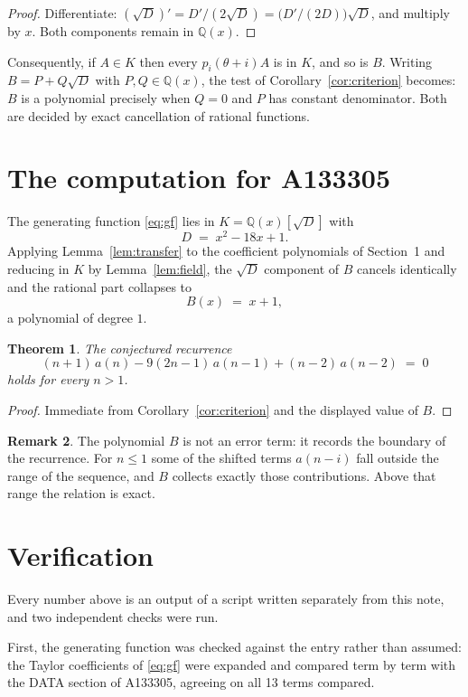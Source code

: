 \documentclass[11pt,a4paper]{article}
\theoremstyle{plain}
\newtheorem{theorem}{Theorem}
\theoremstyle{definition}
\newtheorem{remark}[theorem]{Remark}
\begin{document}
\begin{proof}
Differentiate: $(\sqrt{D})'=D'/(2\sqrt{D})=\bigl(D'/(2D)\bigr)\sqrt{D}$, and multiply by
$x$. Both components remain in $\mathbb{Q}(x)$.
\end{proof}

Consequently, if $A\in K$ then every $p_{i}(\theta+i)A$ is in $K$, and so is $B$. Writing
$B=P+Q\sqrt{D}$ with $P,Q\in\mathbb{Q}(x)$, the test of Corollary~\ref{cor:criterion}
becomes: $B$ is a polynomial precisely when $Q=0$ and $P$ has constant denominator. Both
are decided by exact cancellation of rational functions.

\section{The computation for A133305}

The generating function \eqref{eq:gf} lies in $K=\mathbb{Q}(x)[\sqrt{D}]$ with
\[
D \;=\; x^{2} - 18 x + 1 .
\]
Applying Lemma~\ref{lem:transfer} to the coefficient polynomials of Section~1 and reducing
in $K$ by Lemma~\ref{lem:field}, the $\sqrt{D}$ component of $B$ cancels identically and
the rational part collapses to
\[
B(x)\;=\;x + 1 ,
\]
a polynomial of degree $1$.

\begin{theorem}
The conjectured recurrence
\[
(n + 1)\,a(n) -  9 \left(2 n - 1\right)\,a(n-1) + (n - 2)\,a(n-2) \;=\;0
\]
holds for every $n>1$.
\end{theorem}

\begin{proof}
Immediate from Corollary~\ref{cor:criterion} and the displayed value of $B$.
\end{proof}

\begin{remark}
The polynomial $B$ is not an error term: it records the boundary of the recurrence. For
$n\le1$ some of the shifted terms $a(n-i)$ fall outside the range of the sequence,
and $B$ collects exactly those contributions. Above that range the relation is exact.
\end{remark}

\section{Verification}

Every number above is an output of a script written separately from this note, and two
independent checks were run.

First, the generating function was checked against the entry rather than assumed: the
Taylor coefficients of \eqref{eq:gf} were expanded and compared term by term with the DATA
section of A133305, agreeing on all 13 terms compared.
\end{document}
